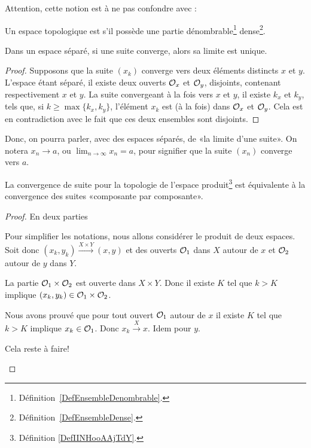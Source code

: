 Attention, cette notion est à ne pas confondre avec :
\begin{definition}  \label{DefUADooqilFK}
    Un espace topologique est  s'il possède une partie dénombrable\footnote{Définition~\ref{DefEnsembleDenombrable}.} dense\footnote{Définition~\ref{DefEnsembleDense}.}.
\end{definition}

\begin{proposition}\label{PropUniciteLimitePourSuites}
  Dans un espace séparé, si une suite converge, alors sa limite est unique.
\end{proposition}
\begin{proof}
  Supposons que la suite \( (x_k)\) converge vers deux éléments distincts \( x \) et \( y \). L'espace étant séparé, il existe deux ouverts \( \mathcal{O}_x \) et \( \mathcal{O}_y \), disjoints, contenant respectivement \( x \) et \( y \). La suite convergeant à la fois vers \( x \) et \( y \), il existe \( k_x \) et \( k_y \), tels que, si \( k \geq \max\{k_x, k_y\} \), l'élément  \( x_k \) est (à la fois) dans  \( \mathcal{O}_x \) et \( \mathcal{O}_y \). Cela est en contradiction avec le fait que ces deux ensembles sont disjoints.
\end{proof}

\begin{normaltext}
  Donc, on pourra parler, avec des espaces séparés, de «la limite d'une suite». On notera \( x_n\to a\), ou \(\lim_{n\to \infty} x_n = a \), pour signifier que la suite \( (x_n) \) converge vers \( a \). 
\end{normaltext}

\begin{proposition}      \label{PROPooNRRIooCPesgO}
    La convergence de suite pour la topologie de l'espace produit\footnote{Définition \ref{DefIINHooAAjTdY}.} est équivalente à la convergence des suites «composante par composante».
\end{proposition}

\begin{proof}
    En deux parties
    \begin{subproof}
        \item[Sens direct]
            Pour simplifier les notations, nous allons considérer le produit de deux espaces. Soit donc \( (x_k,y_k)\stackrel{X\times Y}{\longrightarrow}(x,y)\) et des ouverts \( \mathcal{O}_1\) dans \( X\) autour de \( x\) et \( \mathcal{O}_2\) autour de \( y\) dans \( Y\). 

            La partie \( \mathcal{O}_1\times \mathcal{O}_2\) est ouverte dans \( X\times Y\). Donc il existe \( K\) tel que \( k>K\) implique \( (x_k,y_k)\in \mathcal{O}_1\times \mathcal{O}_2\).

            Nous avons prouvé que pour tout ouvert \( \mathcal{O}_1\) autour de \( x\) il existe \( K\) tel que \( k>K\) implique \( x_k\in \mathcal{O}_1\). Donc \( x_k\stackrel{X}{\longrightarrow}x\). Idem pour \( y\).

        \item[Dans l'autre sens]
            Cela reste à faire!
    \end{subproof}
\end{proof}


